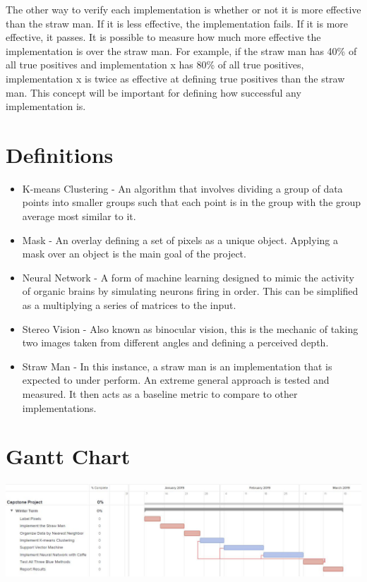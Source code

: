 \documentclass[10pt,journal,compsoc, draftclsnofoot,onecolumn]{IEEEtran}
\begin{document}
\noindent
The other way to verify each implementation is whether or not it is more effective than the straw man.
If it is less effective, the implementation fails.
If it is more effective, it passes.
It is possible to measure how much more effective the implementation is over the straw man.
For example, if the straw man has 40\% of all true positives and implementation x has 80\% of all true positives, implementation x is twice as effective at defining true positives than the straw man.
This concept will be important for defining how successful any implementation is.


\newpage
\section{Definitions}
\begin{itemize}
\item K-means Clustering - An algorithm that involves dividing a group of data points into smaller groups such that each point is in the group with the group average most similar to it.

\item Mask - An overlay defining a set of pixels as a unique object.
Applying a mask over an object is the main goal of the project.

\item Neural Network - A form of machine learning designed to mimic the activity of organic brains by simulating neurons firing in order. This can be simplified as a multiplying a series of matrices to the input.

\item Stereo Vision - Also known as binocular vision, this is the mechanic of taking two images taken from different angles and defining a perceived depth.

\item Straw Man - In this instance, a straw man is an implementation that is expected to under perform.
An extreme general approach is tested and measured.
It then acts as a baseline metric to compare to other implementations.


\end{itemize}

\section{Gantt Chart}
\includegraphics[width=\textwidth]{gantt_chart.JPG}
\end{document}
